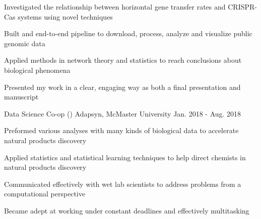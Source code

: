 \begin{cventries}
      {
        \begin{cvitems}
         \item {Investigated the relationship between horizontal gene transfer rates and CRISPR-Cas systems using novel techniques}
         \item {Built and end-to-end pipeline to download, process, analyze and visualize public genomic data}
         \item {Applied methods in network theory and statistics to reach conclusions about biological phenomena}
         \item {Presented my work in a clear, engaging way as both a final presentation and manuscript}
        \end{cvitems}
      }
    \cventry
      {Data Science Co-op ()}
      {Adapsyn, McMaster University}
      {Jan. 2018 - Aug. 2018}
      {}%
      {
        \begin{cvitems}
         \item {Preformed various analyses with many kinds of biological data to accelerate natural products discovery}
         \item {Applied statistics and statistical learning techniques to help direct chemists in natural products discovery}
         \item {Communicated effectively with wet lab scientists to address problems from a computational perspective}
         \item {Became adept at working under constant deadlines and effectively multitasking}
        \end{cvitems}
      }

\end{cventries}
